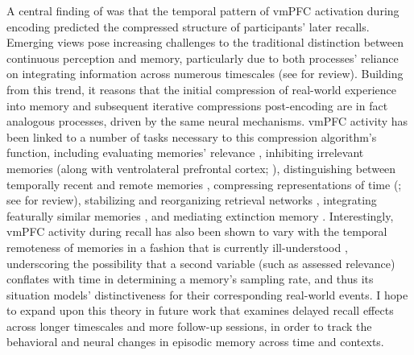 \documentclass{article}
\begin{document}
A central finding of \cite{HeusEtal18c} was that the temporal pattern of vmPFC activation during encoding predicted the compressed structure of participants' later recalls.  Emerging views pose increasing challenges to the traditional distinction between continuous perception and memory, particularly due to both processes' reliance on integrating information across numerous timescales (see \citealp{HassEtal15} for review).  Building from this trend, it reasons that the initial compression of real-world experience into memory and subsequent iterative compressions post-encoding are in fact analogous processes, driven by the same neural mechanisms.  vmPFC activity has been linked to a number of tasks necessary to this compression algorithm's function, including evaluating memories' relevance \citep{NieuTaka11}, inhibiting irrelevant memories (along with ventrolateral prefrontal cortex; \citealp{KuhlEtal07, WimbEtal08, WimbEtal09, WimbEtal11, WimbEtal15}), distinguishing between temporally recent and remote memories \citep{BonnEtal12}, compressing representations of time (\citealp{TigaEtal16}; see \citealp{Howa18} for review), stabilizing and reorganizing retrieval networks \citep{TakaEtal07}, integrating featurally similar memories \citep{TseEtal07,ZeitPres10,TseEtal11}, and mediating extinction memory \citep{MadsEtal17}.  Interestingly, vmPFC activity during recall has also been shown to vary with the temporal remoteness of memories in a fashion that is currently ill-understood \citep{MaguEtal01, NikiLuo02, OddoEtal10, BarrEtal18}, underscoring the possibility that a second variable (such as assessed relevance) conflates with time in determining a memory's sampling rate, and thus its situation models' distinctiveness for their corresponding real-world events.  I hope to expand upon this theory in future work that examines delayed recall effects across longer timescales and more follow-up sessions, in order to track the behavioral and neural changes in episodic memory across time and contexts.
\end{document}
